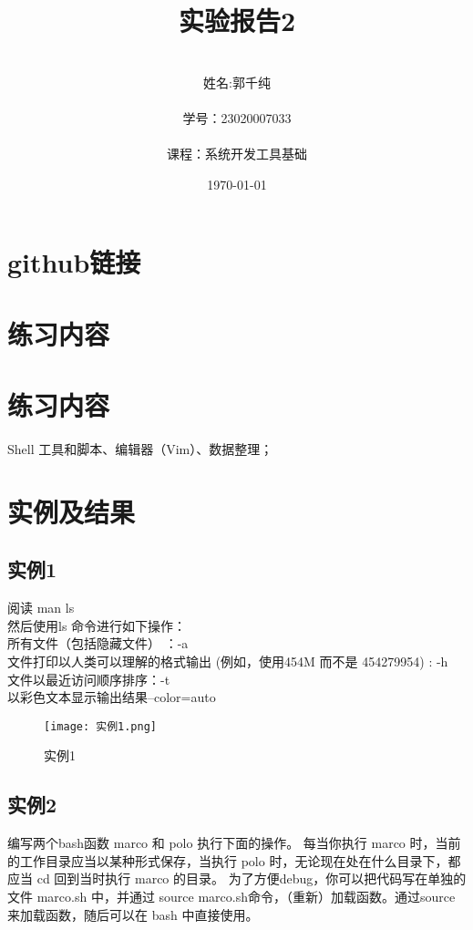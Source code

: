 \documentclass[a4paper, 12pt]{article}
\begin{document}
  \title{实验报告2}
  \author{\\姓名:郭千纯\\
		\\学号：23020007033\\
		\\课程：系统开发工具基础\\}
  \date{\today\\}
  \maketitle
{}
\tableofcontents
\newpage
{}
\section{github链接}
\section{练习内容}
\section{练习内容}
Shell 工具和脚本、编辑器（Vim）、数据整理；

\section{实例及结果}

\subsection{实例1}
阅读 man ls 
\\然后使用ls 命令进行如下操作：
\\所有文件（包括隐藏文件） ：-a
\\文件打印以人类可以理解的格式输出 (例如，使用454M 而不是 454279954) : -h
\\文件以最近访问顺序排序：-t
\\以彩色文本显示输出结果--color=auto

\begin{figure}[h!]
  \centering
  \texttt{[image: 实例1.png]}
  \caption{实例1}
\end{figure}

\subsection{实例2}
编写两个bash函数 marco 和 polo 执行下面的操作。 每当你执行 marco 时，当前的工作目录应当以某种形式保存，当执行 polo 时，无论现在处在什么目录下，都应当 cd 回到当时执行 marco 的目录。 为了方便debug，你可以把代码写在单独的文件 marco.sh 中，并通过 source marco.sh命令，（重新）加载函数。通过source 来加载函数，随后可以在 bash 中直接使用。
\end{document}
